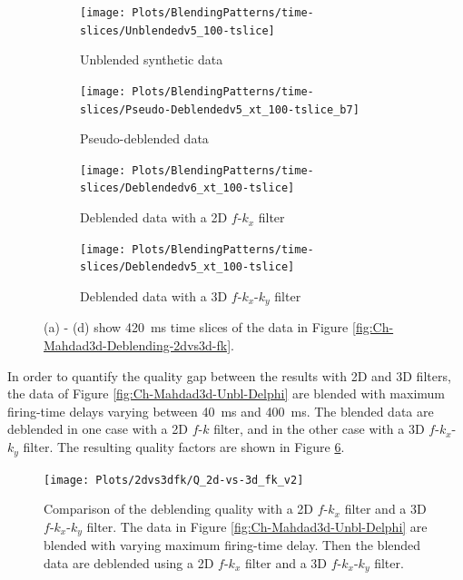 \begin{figure}
	
	\centering
	\begin{subfigure}[t]{0.45\textwidth}
		\centering
		\texttt{[image: Plots/BlendingPatterns/time-slices/Unblendedv5\_100-tslice]}
		\caption{Unblended synthetic data}
		\label{fig:Ch-Mahdad3d-Unbl-Delphi-tslice}
	\end{subfigure}
	\centering
	\begin{subfigure}[t]{0.45\textwidth}
		\texttt{[image: Plots/BlendingPatterns/time-slices/Pseudo-Deblendedv5\_xt\_100-tslice\_b7]}
		\caption{Pseudo-deblended data}
		\label{fig:Ch-Mahdad3d-Deblending-Pseudo-Zoom-tslice}
	\end{subfigure}
	
	\par\bigskip

	\centering
	\begin{subfigure}[t]{0.45\textwidth}
		\texttt{[image: Plots/BlendingPatterns/time-slices/Deblendedv6\_xt\_100-tslice]}
		\caption{Deblended data with a 2D $f$-$k_x$ filter}
		\label{fig:Ch-Mahdad3d-Deblending-2dfk-tslice}
	\end{subfigure}
	\centering
	\begin{subfigure}[t]{0.45\textwidth}
		\texttt{[image: Plots/BlendingPatterns/time-slices/Deblendedv5\_xt\_100-tslice]}
		\caption{Deblended data with a 3D $f$-$k_x$-$k_y$ filter}
		\label{fig:Ch-Mahdad3d-Deblending-3dfk-tslice}
	\end{subfigure}
	
	\caption{(a) - (d) show \SI{420}{\milli\second} time slices of the data in Figure \ref{fig:Ch-Mahdad3d-Deblending-2dvs3d-fk}.}
	\label{fig:Ch-Mahdad3d-Deblending-2dvs3d-fk-tslice}
	
\end{figure}


In order to quantify the quality gap between the results with 2D and 3D filters, the data of Figure \ref{fig:Ch-Mahdad3d-Unbl-Delphi} are blended with maximum firing-time delays varying between \SI{40}{\milli\second} and \SI{400}{\milli\second}. The blended data are deblended in one case with a 2D $f$-$k$ filter, and in the other case with a 3D $f$-$k_x$-$k_y$ filter. The resulting quality factors are shown in Figure \ref{fig:Ch-Mahdad3d-2dvs3dfk}.



\begin{figure}
	\centering
	\texttt{[image: Plots/2dvs3dfk/Q\_2d-vs-3d\_fk\_v2]}
	\caption{Comparison of the deblending quality with a 2D $f$-$k_x$ filter and a 3D $f$-$k_x$-$k_y$ filter. The data in Figure \ref{fig:Ch-Mahdad3d-Unbl-Delphi} are blended with varying maximum firing-time delay. Then the blended data are deblended using a 2D $f$-$k_x$ filter and a 3D $f$-$k_x$-$k_y$ filter.}
	\label{fig:Ch-Mahdad3d-2dvs3dfk}
\end{figure}


